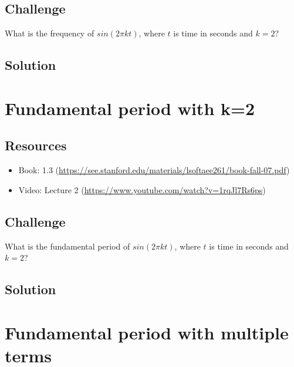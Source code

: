 \subsection*{Challenge}
What is the frequency of $sin(2 \pi k t)$, where $t$ is time in seconds and $k=2$?

\subsection*{Solution}





\newpage

\section{Fundamental period with k=2}

\subsection*{Resources}
\begin{itemize}
    \item Book: 1.3 (\url{https://see.stanford.edu/materials/lsoftaee261/book-fall-07.pdf})
    \item Video: Lecture 2 (\url{https://www.youtube.com/watch?v=1rqJl7Rs6ps})
\end{itemize}

\subsection*{Challenge}
What is the fundamental period of $sin(2 \pi k t)$, where $t$ is time in seconds and $k=2$?

\subsection*{Solution}





\newpage

\section{Fundamental period with multiple terms}

